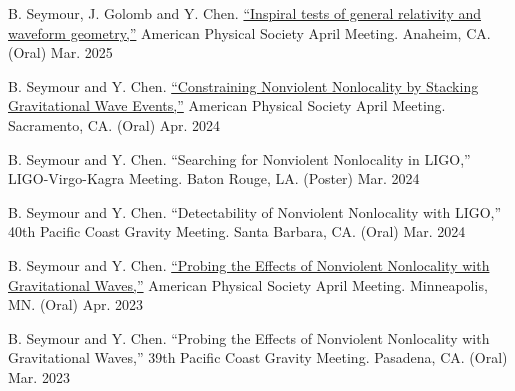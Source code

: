 

\begin{cvpresentationsmod}



    \cvpresentation
    {B. Seymour, J. Golomb and Y. Chen. \href{https://summit.aps.org/events/APR-S18/1}{“Inspiral tests of general relativity and waveform geometry,”} American Physical Society April Meeting. Anaheim, CA. (Oral)}
    {Mar. 2025}
    

    \cvpresentation
    {B. Seymour and Y. Chen. \href{https://meetings.aps.org/Meeting/APR24/Session/H17.7}{“Constraining Nonviolent Nonlocality by Stacking Gravitational Wave Events,”} American Physical Society April Meeting. Sacramento, CA. (Oral)}
    {Apr. 2024}
    

    \cvpresentation
    {B. Seymour and Y. Chen. “Searching for Nonviolent Nonlocality in LIGO,” LIGO-Virgo-Kagra Meeting. Baton Rouge, LA. (Poster)}
    {Mar. 2024}
    

    \cvpresentation
    {B. Seymour and Y. Chen. “Detectability of Nonviolent Nonlocality with LIGO,” 40th Pacific Coast Gravity Meeting. Santa Barbara, CA. (Oral)}
    {Mar. 2024}


    \cvpresentation
    {B. Seymour and Y. Chen. \href{https://meetings.aps.org/Meeting/APR23/Session/C08.9}{“Probing the Effects of Nonviolent Nonlocality with Gravitational Waves,”} American Physical Society April Meeting. Minneapolis, MN. (Oral)}
    {Apr. 2023}
    

    \cvpresentation
    {B. Seymour and Y. Chen. “Probing the Effects of Nonviolent Nonlocality with Gravitational Waves,” 39th Pacific Coast Gravity Meeting. Pasadena, CA. (Oral)}
    {Mar. 2023}


\end{cvpresentationsmod}
